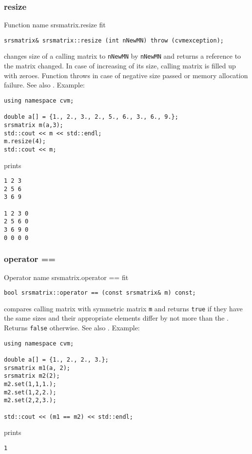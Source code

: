 \subsubsection{resize}
Function%
\pdfdest name {srsmatrix.resize} fit
\begin{verbatim}
srsmatrix& srsmatrix::resize (int nNewMN) throw (cvmexception);
\end{verbatim}
changes  size of a calling matrix to \verb"nNewMN" by \verb"nNewMN"
and returns a reference to
the matrix changed. In case of increasing of its size, calling matrix
is filled up with zeroes.
Function throws  
in case of negative size passed or memory allocation failure.
See also .
Example:
\begin{Verbatim}
using namespace cvm;

double a[] = {1., 2., 3., 2., 5., 6., 3., 6., 9.};
srsmatrix m(a,3);
std::cout << m << std::endl;
m.resize(4);
std::cout << m;
\end{Verbatim}
prints
\begin{Verbatim}
1 2 3
2 5 6
3 6 9

1 2 3 0
2 5 6 0
3 6 9 0
0 0 0 0
\end{Verbatim}
\newpage


\subsubsection{operator ==}
Operator%
\pdfdest name {srsmatrix.operator ==} fit
\begin{verbatim}
bool srsmatrix::operator == (const srsmatrix& m) const;
\end{verbatim}
compares  calling  matrix with symmetric matrix \verb"m"
and returns \verb"true" if they have the same sizes
and their appropriate elements differ by not more than the
.
Returns \verb"false" otherwise.
See also .
Example:
\begin{Verbatim}
using namespace cvm;

double a[] = {1., 2., 2., 3.};
srsmatrix m1(a, 2);
srsmatrix m2(2);
m2.set(1,1,1.); 
m2.set(1,2,2.);
m2.set(2,2,3.);

std::cout << (m1 == m2) << std::endl;
\end{Verbatim}
prints
\begin{Verbatim}
1
\end{Verbatim}
\newpage




